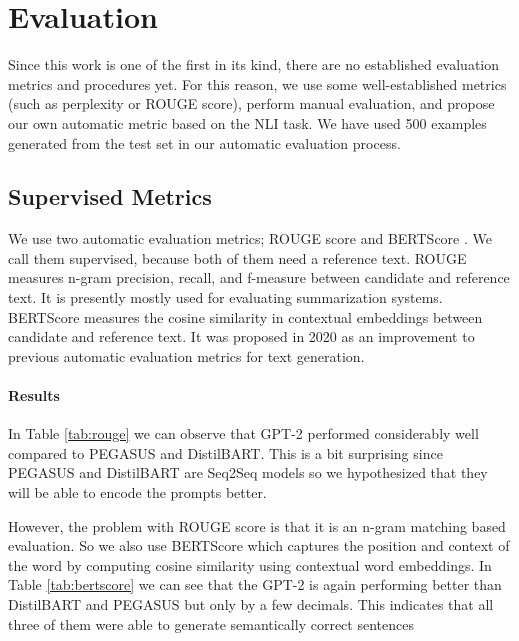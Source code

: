 \documentclass[11pt,a4paper]{article}
\begin{document}
\section{Evaluation}
\label{sec:eval}
Since this work is one of the first in its kind, there are no established evaluation metrics and procedures yet.
For this reason, we use some well-established metrics (such as perplexity or ROUGE score), perform manual evaluation, and propose our own automatic metric based on the NLI task. We have used 500 examples generated from the test set in our automatic evaluation process.

\subsection{Supervised Metrics}
We use two automatic evaluation metrics; ROUGE score \citep{lin-2004-rouge} and BERTScore \citep{Zhang*2020BERTScore:}. We call them supervised, because both of them need a reference text. ROUGE measures n-gram precision, recall, and f-measure between candidate and reference text. It is presently mostly used for evaluating summarization systems. BERTScore measures the cosine similarity in contextual embeddings between candidate and reference text. It was proposed in 2020 as an improvement to previous automatic evaluation metrics for text generation. 

\paragraph{Results}

In Table \ref{tab:rouge} we can observe that GPT-2 performed considerably well compared to PEGASUS and DistilBART. This is a bit surprising since PEGASUS and DistilBART are Seq2Seq models so we hypothesized that they will be able to encode the prompts better. 

However, the problem with ROUGE score is that it is an n-gram matching based evaluation. So we also use BERTScore which captures the position and context of the word by computing cosine similarity using contextual word embeddings. In Table \ref{tab:bertscore} we can see that the GPT-2 is again performing better than DistilBART and PEGASUS but only by a few decimals. This indicates that all three of them were able to generate semantically correct sentences
\end{document}
